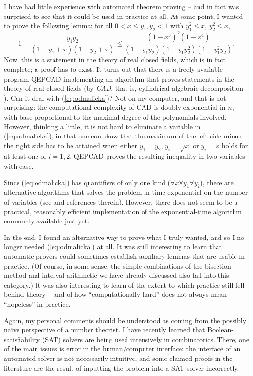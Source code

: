 I have had little experience with automated theorem proving -- and in fact
was surprised to see that it could be used in practice at all. At some point,
I wanted to prove the following lemma: 
 for all  $0<x\leq y_1,y_2<1$ with $y_1^2\leq x$, $y_2^2\leq x$,
\begin{equation}\label{eq:odmalicka}
1 + \frac{y_1 y_2}{(1-y_1+x) (1-y_2+x)} \leq
 \frac{(1-x^3)^2 (1-x^4)}{(1- y_1 y_2) (1 - y_1 y_2^2) (1 - y_1^2 y_2)} .
\end{equation}
Now, this is a statement in the theory of real closed fields, which is in fact
complete; a proof has to exist. It turns out that there is a freely available
program QEPCAD \cite{QEPCAD} implementing an algorithm that proves statements
in the theory of real closed fields (by {\em CAD}, that is,
cylindrical algebraic
  decomposition \cite{MR0403962}). Can it deal with (\ref{eq:odmalicka})?
Not on my computer, and that is not surprising: the computational
complexity of CAD is doubly exponential in $n$, with base proportional
to the maximal degree of the polynomials involved. However,
thinking a little, it is not hard to eliminate a variable in
(\ref{eq:odmalicka}), in that one can show that the maximum of the
left side minus the right side has to be attained when either
$y_1 = y_2$, $y_i = \sqrt{x}$ or $y_i = x$ holds for at least one of $i=1,2$.
QEPCAD proves the resulting inequality in two variables with ease.

Since (\ref{eq:odmalicka}) has quantifiers of only one kind
($\forall x \forall y_1 \forall y_2$), there are alternative algorithms
that solves the problem in time exponential on the number of variables
(see \cite[Ch. 11]{opac-b1124307} and references therein).
However, there does not seem to be a practical, reasonably efficient
implementation of the exponential-time algorithm commonly available just yet.

In the end, I found an alternative way to prove what I truly wanted, and so
I no longer needed (\ref{eq:odmalicka}) at all. It was still interesting to
learn that automatic provers could sometimes establish auxiliary lemmas that
are usable in practice. (Of course, in some sense,
the simple combinations of the bisection method and interval arithmetic
we have already discussed also fall into this category.) It was also
interesting to learn of the extent to which
practice still fell behind theory -- and
of how ``computationally hard'' does not always mean ``hopeless'' in practice.

Again, my personal comments should be understood as coming from the possibly
na\"ive perspective of a number theorist. I have recently learned that
Boolean-satisfiability (SAT) solvers are being used intensively in
combinatorics. There, one of the main issues is error in the human/computer
interface: the interface of an automated solver is not necessarily
intuitive, and some claimed proofs in the literature are the result of
inputting the problem into a SAT solver incorrectly.

